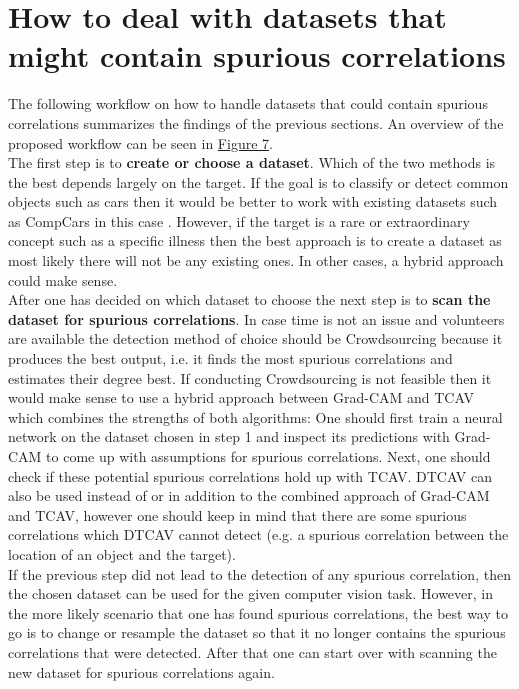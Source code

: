 \documentclass{article}
\begin{document}
\section{How to deal with datasets that might contain spurious correlations}
The following workflow on how to handle datasets that could contain spurious correlations summarizes the findings of the previous sections.
An overview of the proposed workflow can be seen in \hyperref[fig:workflow]{Figure 7}. \\
The first step is to \textbf{create or choose a dataset}. Which of the two methods is the best depends largely on the target. If the goal is to classify or
detect common objects such as cars then it would be better to work with existing datasets such as CompCars in this case \cite{Yang_2015_CVPR}.
However, if the target is a rare or extraordinary concept such as a specific illness then the best approach is to create a dataset as most likely there will
not be any existing ones. In other cases, a hybrid approach could make sense. \\
After one has decided on which dataset to choose the next step is to \textbf{scan the dataset for spurious correlations}. In case time is not an issue
and volunteers are available the detection method of choice should be Crowdsourcing because it produces the best output, i.e. it finds the most spurious
correlations and estimates their degree best. If conducting Crowdsourcing is not feasible then it would make sense to use a hybrid approach between Grad-CAM and TCAV which
combines the strengths of both algorithms: One should first train a neural network on the dataset chosen in step 1 and inspect its predictions with Grad-CAM
to come up with assumptions for spurious correlations. Next, one should check if these potential spurious correlations hold up with TCAV. DTCAV can also be used 
instead of or in addition to the combined approach of Grad-CAM and TCAV, however one should keep in mind that there are some spurious correlations which DTCAV cannot detect
(e.g. a spurious correlation between the location of an object and the target). \\
If the previous step did not lead to the detection of any spurious correlation, then the chosen dataset can be used for the given computer vision task. 
However, in the more likely scenario that one has found spurious correlations, the best way to go is to change or resample the dataset so that it no longer
contains the spurious correlations that were detected. After that one can start over with scanning the new dataset for spurious correlations again. \\
\end{document}
